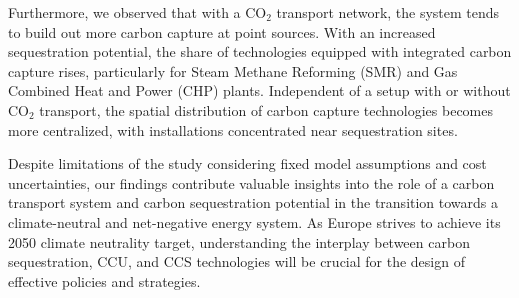 \documentclass[twocolumn]{article}
\newcommand{\carbon}{CO$_2$}
\newcommand{\hydrogen}{H$_2$}
\begin{document}
Furthermore, we observed that with a \carbon{} transport network, the system tends to build out more carbon capture at point sources. With an increased sequestration potential, the share of technologies equipped with integrated carbon capture rises, particularly for Steam Methane Reforming (SMR) and Gas Combined Heat and Power (CHP) plants. Independent of a setup with or without \carbon{} transport, the spatial distribution of carbon capture technologies becomes more centralized, with installations concentrated near sequestration sites.

Despite limitations of the study considering fixed model assumptions and cost uncertainties, our findings contribute valuable insights into the role of a carbon transport system and carbon sequestration potential in the transition towards a climate-neutral and net-negative energy system. As Europe strives to achieve its 2050 climate neutrality target, understanding the interplay between carbon sequestration, CCU, and CCS technologies will be crucial for the design of effective policies and strategies.


\printbibliography

\appendix





\end{document}
